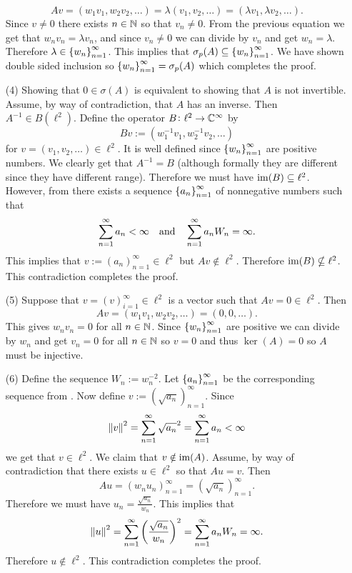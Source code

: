 \documentclass[11pt,a4paper]{article}
\begin{document}
\begin{solution}
\begin{enumerate}
      \[
        Av =
        (w_1 v_1, w_2 v_2, \dots) =
        \lambda (v_1, v_2, \dots) =
        (\lambda v_1, \lambda v_2, \dots).
      \]
      Since $v \neq 0$ there exists $n \in \N$ so that $v_n \neq 0$.
      From the previous equation we get that $w_n v_n = \lambda v_n$,
      and since $v_n \neq 0$ we can divide by $v_n$ and get $w_n = \lambda$.
      Therefore $\lambda \in \set{w_n}_{n=1}^{\infty}$.
      This implies that $\sigma_p(A) \subseteq \set{w_n}_{n=1}^{\infty}$.
      We have shown double sided inclusion so
      $\set{w_n}_{n=1}^{\infty} = \sigma_p(A)$ which completes the proof.
    \item[(4)] Showing that $0 \in \sigma(A)$ is equivalent to showing
      that $A$ is not invertible.
      Assume, by way of contradiction, that $A$ has an inverse.
      Then $A^{-1} \in B(\ell^2)$.
      Define the operator $B \colon \ell^2 \to \mathbb{C}^{\infty}$ by
      \[
        Bv :=
        (w_1^{-1} v_1, w_2^{-1} v_2, \dots)
      \]
      for $v = (v_1,v_2,\dots) \in \ell^2$.
      It is well defined since $\left\{w_n\right\}_{n=1}^{\infty}$ are positive
      numbers.
      We clearly get that $A^{-1} = B$ (although formally they are different
      since they have different range).
      Therefore we must have $\operatorname{im}(B) \subseteq \ell^2$.
      However, from  there exists
      a sequence $\left\{a_n\right\}_{n=1}^{\infty}$ of nonnegative
      numbers such that
      \[
        \sum_{n=1}^{\infty} a_n < \infty \quad \text{and} \quad
        \sum_{n=1}^{\infty} a_n W_n = \infty.
      \]
      This implies that $v := (a_n)_{n=1}^{\infty} \in \ell^2$
      but $Av \notin \ell^2$.
      Therefore $\operatorname{im}(B) \nsubseteq \ell^2$.
      This contradiction completes the proof.
    \item[(5)] Suppose that $v = (v)_{i=1}^{\infty} \in \ell^2$
      is a vector such that $Av = 0 \in \ell^2$.
      Then
      \[
        Av =
        (w_1 v_1, w_2 v_2, \dots) =
        (0, 0, \dots).
      \]
      This gives $w_n v_n = 0$ for all $n \in \N$.
      Since $\left\{w_n\right\}_{n=1}^{\infty}$ are positive we
      can divide by $w_n$ and get $v_n = 0$ for all $n \in \N$
      so $v = 0$ and thus $\ker(A) = 0$
      so $A$ must be injective.
    \item[(6)] Define the sequence $W_n := w_n^{-2}$.
      Let $\left\{a_n\right\}_{n=1}^{\infty}$ be the corresponding sequence from
      .
      Now define $v := (\sqrt{a_n})_{n=1}^{\infty}$.
      Since
      \[
        \left\lVert v\right\rVert^2 =
        \sum_{n=1}^{\infty} \sqrt{a_n}^2 =
        \sum_{n=1}^{\infty} a_n < \infty
      \]
      we get that $v \in \ell^2$.
      We claim that $v \notin \operatorname{im}(A)$.
      Assume, by way of contradiction that there exists $u \in \ell^2$
      so that $Au = v$.
      Then
      \[
        Au =
        (w_n u_n)_{n=1}^{\infty} =
        (\sqrt{a_n})_{n=1}^{\infty}.
      \]
      Therefore we must have $u_n = \frac{\sqrt{a_n}}{w_n}$.
      This implies that
      \[
        \norm{u}^2 =
        \sum_{n=1}^{\infty} \del{\frac{\sqrt{a_n}}{w_n}}^2 =
        \sum_{n=1}^{\infty} a_n W_n = \infty.
      \]
      Therefore $u \notin \ell^2$.
      This contradiction completes the proof.
  \end{enumerate}
\end{solution}
\end{document}

